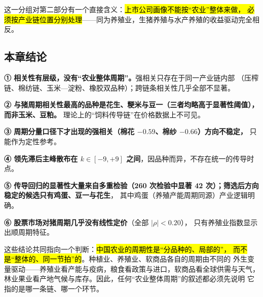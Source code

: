 这一分组对第二部分有一个直接含义：\hl{上市公司画像不能按“农业”整体来做，
必须按产业链位置分别处理}——同为养殖业，生猪养殖与水产养殖的收益驱动完全相反。

\subsection{本章结论}
\label{sec:corr-conclusion}

\begin{keybox}[六个可检验的结论]
\normalsize
\textbf{① 相关性有层级，没有“农业整体周期”。}强相关只存在于同一产业链内部
（压榨链、棉纺链、玉米---淀粉、橡胶双品种）；跨链条相关性几乎全部不显著。
\par\vspace{3pt}
\textbf{② 与猪周期相关性最高的品种是花生、粳米与豆一（三者均略高于显著性阈值），而非玉米、豆粕。}
理论上的“饲料传导链”在价格数据上不可见。
\par\vspace{3pt}
\textbf{③ 周期分量口径下才出现的强相关（棉花 $-0.59$、棉纱 $-0.66$）方向不稳定，}
只能作为定性参考。
\par\vspace{3pt}
\textbf{④ 领先滞后主峰散布在 $k\in[-9,+9]$ 之间}，因品种而异，不存在统一的传导时点。
\par\vspace{3pt}
\textbf{⑤ 传导回归的显著性大量来自多重检验（260 次检验中显著 42 次）；筛选后方向稳定的候选只有鸡蛋、豆一与花生}，
其中鸡蛋（养殖产能周期同源）产业逻辑明确。
\par\vspace{3pt}
\textbf{⑥ 股票市场对猪周期几乎没有线性定价}（全部 $|\rho|<0.20$），
只有养殖业指数显示出顺周期特征。
\end{keybox}

这些结论共同指向一个判断：\hl{中国农业的周期性是“分品种的、局部的”，
而不是“整体的、同一节拍”的}。种植业、养殖业、软商品各自的周期由不同的
外生变量驱动——养殖业看产能与疫病，粮食看政策与进口，软商品看全球供需与天气，
林业果业看产地气候与库存。因此，任何“农业整体周期”的叙述都必须先说明
它指的是哪一条链、哪一个环节。
